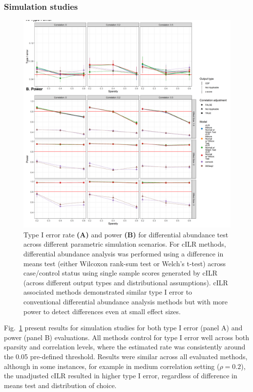 \documentclass[10pt,letterpaper]{article}
\begin{document}
\subsubsection*{Simulation studies}
\begin{figure}[!h]
    \centering
    \includegraphics[width = \textwidth]{figures/sim_diff_ab_comb.png}
    \caption{Type I error rate \textbf{(A)} and power \textbf{(B)} for differential abundance test across different parametric simulation scenarios. For cILR methods, differential abundance analysis was performed using a difference in means test (either Wilcoxon rank-sum test or Welch's t-test) across case/control status using single sample scores generated by cILR (across different output types and distributional assumptions). cILR associated methods demonstrated similar type I error to conventional differential abundance analysis methods but with more power to detect differences even at small effect sizes.} 
    \label{fig:4}
\end{figure}

Fig.~\ref{fig:4} present results for simulation studies for both type I error (panel A) and power (panel B) evaluations. All methods control for type I error well across both sparsity and correlation levels, where the estimated rate was consistently around the 0.05 pre-defined threshold. Results were similar across all evaluated methods, although in some instances, for example in medium correlation setting ($\rho = 0.2$), the unadjusted cILR resulted in higher type I error, regardless of difference in means test and distribution of choice. 
\end{document}
